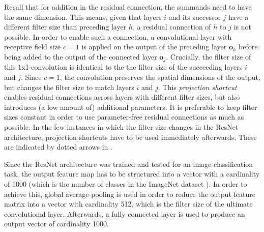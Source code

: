
Recall that for addition in the residual connection, the summands need to have the same dimension. This means, given that layers $i$ and its successor $j$ have a different filter size than preceding layer $h$, a residual connection of $h$ to $j$ is not possible. In order to enable such a connection, a convolutional layer with receptive field size $c=1$ is applied on the output of the preceding layer $\textbf{o}_h$ before being added to the output of the connected layer $\textbf{o}_j$. Crucially, the filter size of this 1x1-convolution is identical to the the filter size of the succeeding layers $i$ and $j$. Since $c=1$, the convolution preserves the spatial dimensions of the output, but changes the filter size to match layers $i$ and $j$. This \emph{projection shortcut} enables residual connections across layers with different filter sizes, but also introduces (a low amount of) additional parameters. It is preferable to keep filter sizes constant in order to use parameter-free residual connections as much as possible. In the few instances in which the filter size changes in the ResNet architecture, projection shortcuts have to be used immediately afterwards. These are indicated by dotted arrows in .


Since the ResNet architecture was trained and tested for an image classification task, the output feature map has to be structured into a vector with a cardinality of 1000 (which is the number of classes in the ImageNet dataset \citep{ILSVRC15}). In order to achieve this, global average-pooling is used in order to reduce the output feature matrix into a vector with cardinality 512, which is the filter size of the ultimate convolutional layer. Afterwards, a fully connected layer is used to produce an output vector of cardinality 1000.

